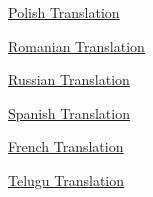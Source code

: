               
            
            
              
                \href{http://www.pdembinski.konin.lm.pl/python\_paradox.html}{Polish Translation}

              
              
              
                \href{http://ro.goobix.com/pg/pypar/}{Romanian Translation}

              
            
            
              
            
            
              
            
            
              
                \href{http://m0sia.ru/graham/pythonparadox}{Russian Translation}

              
              
              
                \href{http://www.fduran.com/wordpress/?p=23}{Spanish Translation}

              
            
            
              
            
            
              
            
            
              
                \href{http://w2.syronex.com/jmr/python-paradox}{French Translation}

              
              
              
                \href{http://www.avilpage.com/2014/12/python-paradox.html}{Telugu Translation}

              
            
            
              
            
          
